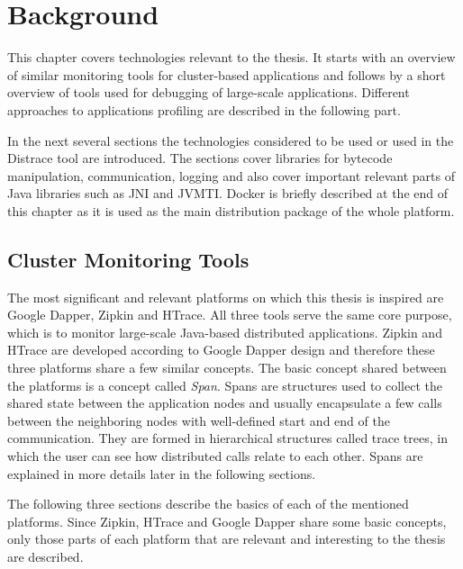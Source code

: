 \chapter{Background}
\label{chap:background}
This chapter covers technologies relevant to the thesis. It starts with an overview of similar monitoring tools for cluster-based applications and follows by a short overview of tools used for debugging of large-scale applications. Different approaches to applications profiling are described in the following part. 

In the next several sections the technologies considered to be used or used in the Distrace tool are introduced. The sections cover libraries for bytecode manipulation, communication, logging and also cover important relevant parts of Java libraries such as JNI and JVMTI. Docker is briefly described at the end of this chapter as it is used as the main distribution package of the whole platform.

\section{Cluster Monitoring Tools}
The most significant and relevant platforms on which this thesis is inspired are Google Dapper, Zipkin and HTrace. All three tools serve the same core purpose, which is to monitor large-scale Java-based distributed applications. Zipkin and HTrace are developed according to Google Dapper design and therefore these three platforms share a few similar concepts. The basic concept shared between the platforms is a concept called \textit{Span}. Spans are structures used to collect the shared state between the application nodes and usually encapsulate a few calls between the neighboring nodes with well-defined start and end of the communication. They are formed in hierarchical structures called trace trees, in which the user can see how distributed calls relate to each other. Spans are explained in more details later in the following sections. 

The following three sections describe the basics of each of the mentioned platforms. Since Zipkin, HTrace and Google Dapper share some basic concepts, only those parts of each platform that are relevant and interesting to the thesis are described.
